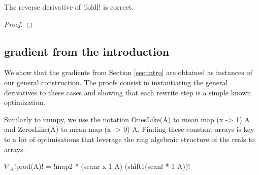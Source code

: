 \begin{proposition}
    The reverse derivative of !foldl! is correct.
\end{proposition}

\begin{proof}
    
\end{proof}

\subsection{gradient from the introduction}

We show that the gradients from Section \ref{sec:intro} are obtained as instances of our general construction. 
The proofs consist in instantiating the general derivatives to these cases 
and showing that each rewrite step is a simple known optimization.

Similarly to numpy, we use the notation OnesLike(A) to mean map (x -> 1) A 
and ZerosLike(A) to mean map (x -> 0) A. 
Finding these constant arrays is key to a lot of optimisations that leverage the ring algebraic structure of the reals to arrays.


 \begin{lemma}
     $\nabla_A$!prod(A)! = !map2 * (scanr x 1 A) (shift1(scanl * 1 A))!
 \end{lemma}

